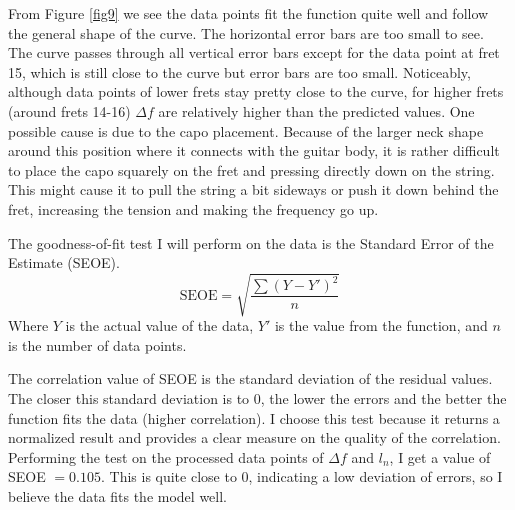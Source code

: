 From Figure \ref{fig9} we see the data points fit the function quite well and follow the general shape of the curve. The horizontal error bars are too small to see. The curve passes through all vertical error bars except for the data point at fret 15, which is still close to the curve but error bars are too small. Noticeably, although data points of lower frets stay pretty close to the curve, for higher frets (around frets 14-16) $\Delta f$ are relatively higher than the predicted values. One possible cause is due to the capo placement. Because of the larger neck shape around this position where it connects with the guitar body, it is rather difficult to place the capo squarely on the fret and pressing directly down on the string. This might cause it to pull the string a bit sideways or push it down behind the fret, increasing the tension and making the frequency go up. \par
The goodness-of-fit test I will perform on the data is the Standard Error of the Estimate (SEOE). 
\begin{equation*}
    \text{SEOE} = \sqrt{\frac{\sum{(Y-Y')^2}}{n}}
\end{equation*}
Where $Y$ is the actual value of the data, $Y'$ is the value from the function, and $n$ is the number of data points. \cite{lane} \par
The correlation value of SEOE is the standard deviation of the residual values. The closer this standard deviation is to 0, the lower the errors and the better the function fits the data (higher correlation). I choose this test because it returns a normalized result and provides a clear measure on the quality of the correlation. Performing the test on the processed data points of $\Delta f$ and $l_n$, I get a value of SEOE $= 0.105$. This is quite close to 0, indicating a low deviation of errors, so I believe the data fits the model well.
